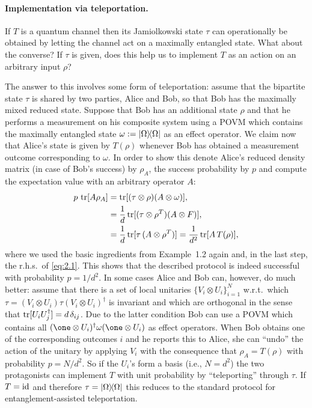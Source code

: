 \documentclass[11pt,a4paper]{article}
\numberwithin{equation}{section}
\theoremstyle{plain}
\theoremstyle{definition}
\begin{document}
\paragraph{Implementation via teleportation.}
If $T$ is a quantum channel then its Jamiolkowski state $\tau$ can operationally be
obtained by letting the channel act on a maximally entangled state. What about the
converse? If $\tau$ is given, does this help us to implement $T$ as an action on an
arbitrary input $\rho$?

The answer to this involves some form of teleportation: assume that the bipartite
state $\tau$ is shared by two parties, Alice and Bob, so that Bob has the maximally
mixed reduced state. Suppose that Bob has an additional state $\rho$ and that he
performs a measurement on his composite system using a POVM which contains the
maximally entangled state $\omega := |\Omega\rangle\!\langle\Omega|$ as an effect operator.
We claim now that Alice's state is given by $T(\rho)$ whenever Bob has obtained a
measurement outcome corresponding to $\omega$. In order to show this denote Alice's
reduced density matrix (in case of Bob's success) by $\rho_A$, the success
probability by $p$ and compute the expectation value with an arbitrary operator $A$:
\begin{align}
    p\,\operatorname{tr}[A\rho_A]
     &= \operatorname{tr}[(\tau \otimes \rho)(A \otimes \omega)], \label{eq:2.5}\\
     &= \frac{1}{d} \operatorname{tr}[(\tau \otimes \rho^{T})(A \otimes F)], \label{eq:2.6}\\
     &= \frac{1}{d} \operatorname{tr}[\tau\,(A \otimes \rho^{T})]
    = \frac{1}{d^2} \operatorname{tr}[A\,T(\rho)], \label{eq:2.7}
\end{align}
where we used the basic ingredients from Example~1.2 again and, in the last step,
the r.h.s.\ of \eqref{eq:2.1}. This shows that the described protocol is indeed
successful with probability $p=1/d^2$. In some cases Alice and Bob can, however, do
much better: assume that there is a set of local unitaries
$\{V_i\otimes U_i\}_{i=1}^N$ w.r.t.\ which
$\tau=(V_i\otimes U_i)\tau(V_i\otimes U_i)^\dagger$ is invariant and which are
orthogonal in the sense that $\operatorname{tr}[U_i U_j^\dagger]=d\,\delta_{ij}$. Due to the latter
condition Bob can use a POVM which contains all
$(\one \otimes U_i)^\dagger \omega (\one\otimes U_i)$ as effect operators. When Bob
obtains one of the corresponding outcomes $i$ and he reports this to Alice, she can
``undo'' the action of the unitary by applying $V_i$ with the consequence that
$\rho_A = T(\rho)$ with probability $p=N/d^2$. So if the $U_i$'s form a basis (i.e.,
$N=d^2$) the two protagonists can implement $T$ with unit probability by
``teleporting'' through $\tau$. If $T=\mathrm{id}$ and therefore $\tau=|\Omega\rangle\!\langle\Omega|$
this reduces to the standard protocol for entanglement-assisted teleportation.
\end{document}
